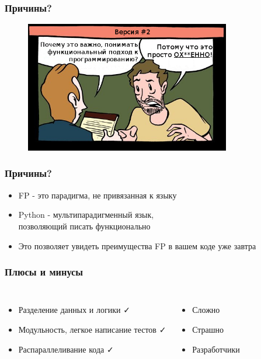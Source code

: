 \documentclass[18pt, compress, aspectratio=169]{beamer}
\def\check{\textcolor{check}{\FA \faCheck}}
\def\fail{\textcolor{fail}{\FA \faRemove}}
\begin{document}
\begin{frame}
    \frametitle{Причины?}
    \vspace{-25pt}
    \begin{figure}
        \includegraphics[width=0.8\textwidth,center]{second_option.png}
    \end{figure}
\end{frame}

\begin{frame}[fragile]
    \frametitle{Причины?}
    \begin{itemize}[label={\MVRightarrow}]
        \item FP - это парадигма, не привязанная к языку
        \item Python - мультипарадигменный язык,\\ позволяющий писать функционально
        \item Это позволяет увидеть преимущества FP в вашем коде уже завтра
    \end{itemize}
\end{frame}

\fontsize{15pt}{16}\selectfont
\begin{frame}
    \frametitle{Плюсы и минусы}
    \vspace{-20pt}
    \begin{columns}[T,onlytextwidth]
    \begin{itemize}[label={\MVRightarrow}, leftmargin=-0.05cm]
            \item <+->Разделение данных и логики \check
            \item <+->Модульность, легкое написание тестов \check
            \item <+->Распараллеливание кода \check
        \end{itemize}

        \begin{itemize}[label={\MVRightarrow}]
            \item <+->Сложно \fail
            \item <+->Страшно \fail
            \item <+->Разработчики \fail
        \end{itemize}
    \end{columns}
\end{frame}
\fontsize{17pt}{18}\selectfont
\end{document}
